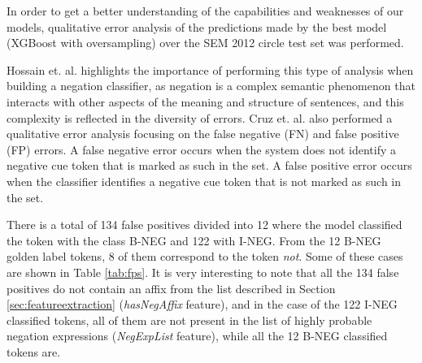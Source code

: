 
In order to get a better understanding of the capabilities and weaknesses of our models, qualitative error analysis of the predictions made by the best model (XGBoost with oversampling) over the SEM 2012 circle test set was performed.

Hossain et. al. \cite{hossain2020predicting} highlights the importance of performing this type of analysis when building a negation classifier, as negation is a complex semantic phenomenon that interacts with other aspects of the meaning and structure of sentences, and this complexity is reflected in the diversity of errors. Cruz et. al. \cite{cruz2016machine} also performed a qualitative error analysis focusing on the false negative (FN) and false positive (FP) errors. A false negative error occurs when the system does not identify a negative cue token that is marked as such in the set. A false positive error occurs when the classifier identifies a negative cue token that is not marked as such in the set.

There is a total of 134 false positives divided into 12 where the model classified the token with the class B-NEG and 122 with I-NEG. From the 12 B-NEG golden label tokens, 8 of them correspond to the token \textit{not}. Some of these cases are shown in Table \ref{tab:fps}. It is very interesting to note that all the 134 false positives do not contain an affix from the list described in Section \ref{sec:featureextraction} (\textit{hasNegAffix} feature), and in the case of the 122 I-NEG classified tokens, all of them are not present in the list of highly probable negation expressions (\textit{NegExpList} feature), while all the 12 B-NEG classified tokens are.


